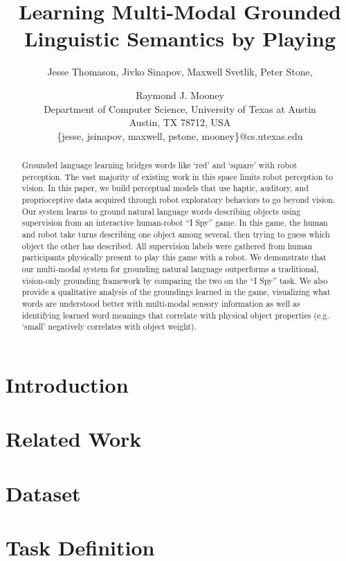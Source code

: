 \documentclass{article}
\title{Learning Multi-Modal Grounded Linguistic Semantics by Playing \ispy}
\author{Jesse Thomason, Jivko Sinapov, Maxwell Svetlik, Peter Stone,\and Raymond J. Mooney \\
Department of Computer Science, University of Texas at Austin\\
Austin, TX 78712, USA\\
\{jesse, jsinapov, maxwell, pstone, mooney\}@cs.utexas.edu}
\newcommand{\ispy}{``I Spy''\xspace}
\begin{document}
\maketitle

\begin{abstract}
Grounded language learning bridges words like `red' and `square' with robot perception.
The vast majority of existing work in this space limits robot perception to vision.
In this paper, we build perceptual models that use haptic, auditory, and proprioceptive data acquired through robot exploratory behaviors to go beyond vision.
Our system learns to ground natural language words describing objects using supervision from an interactive human-robot \ispy game.
In this game, the human and robot take turns describing one object among several, then trying to guess which object the other has described.
All supervision labels were gathered from human participants physically present to play this game with a robot.
We demonstrate that our multi-modal system for grounding natural language outperforms a traditional, vision-only grounding framework by comparing the two on the \ispy task.
We also provide a qualitative analysis of the groundings learned in the game, visualizing what words are understood better with multi-modal sensory information as well as identifying learned word meanings that correlate with physical object properties (e.g. `small' negatively correlates with object weight).
\end{abstract}

\section{Introduction}
\label{sec:introduction}
	

\section{Related Work}
\label{sec:relatedwork}
	

\section{Dataset}
\label{sec:dataset}
	

\section{Task Definition}
\label{sec:taskdefinition}
	
\end{document}
